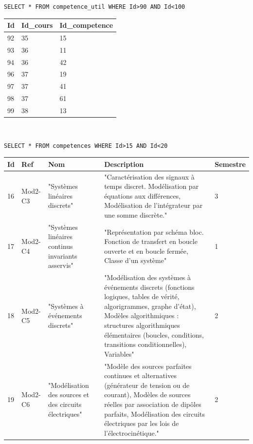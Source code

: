 \newpage

\begin{GrayBox}[0.85\textwidth]
\begin{verbatim}SELECT * FROM competence_util WHERE Id>90 AND Id<100
\end{verbatim}
\end{GrayBox}

\begin{center}
\begin{tabular}{|p{0.5cm}|p{2cm}|p{4cm}|}
\hline
\textbf{Id} & Id\_cours & Id\_competence \\ \hline
92 & 35 & 15 \\ \hline
93 & 36 & 11 \\ \hline
94 & 36 & 42 \\ \hline
96 & 37 & 19 \\ \hline
97 & 37 & 41 \\ \hline
98 & 37 & 61 \\ \hline
99 & 38 & 13 \\ \hline
\end{tabular}
\end{center}

~\

\begin{GrayBox}[0.85\textwidth]
\begin{verbatim}SELECT * FROM competences WHERE Id>15 AND Id<20
\end{verbatim}
\end{GrayBox}

\begin{center}
\begin{tabular}{|p{1cm}|p{2cm}|p{3cm}|p{6cm}|p{2cm}|}
\hline
\textbf{Id} & Ref & Nom & Description & Semestre \\ \hline
16 & Mod2-C3 & "Systèmes linéaires discrets" & "Caractérisation des signaux à temps discret. Modélisation par équations aux différences, Modélisation de l'intégrateur par une somme discrète." & 3 \\ \hline
17 & Mod2-C4 & "Systèmes linéaires continus invariants asservis" & "Représentation par schéma bloc. Fonction de transfert en boucle ouverte et en boucle fermée, Classe d'un système" & 1 \\ \hline
18 & Mod2-C5 & "Systèmes à événements discrets" & "Modélisation des systèmes à événements discrets (fonctions logiques, tables de vérité, algorigrammes, graphe d'état), Modèles algorithmiques : structures algorithmiques élémentaires (boucles, conditions, transitions conditionnelles), Variables" & 2 \\ \hline
19 & Mod2-C6 & "Modélisation des sources et des circuits électriques" & "Modèle des sources parfaites continues et alternatives (générateur de tension ou de courant), Modèles de sources réelles par association de dipôles parfaits, Modélisation des circuits électriques par les lois de l'électrocinétique." & 2 \\ \hline
\end{tabular}
\end{center}


